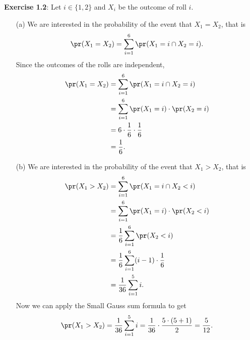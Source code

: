 \textbf{Exercise 1.2}: Let $i \in \{ 1,2 \}$ and $X_i$ be the outcome of roll $i$.

\begin{enumerate}
  \item[(a)] We are interested in the probability of the event that $X_1 = X_2$,
    that is
    \[
      \pr(X_1 = X_2) = \sum_{i=1}^6 \pr(X_1 = i \cap X_2 = i).
    \]
    Since the outcomes of the rolls are independent,
    \begin{align*}
      \pr(X_1 = X_2)  &= \sum_{i=1}^6 \pr(X_1 = i \cap X_2 = i) \\
                      &= \sum_{i=1}^6 \pr(X_1 = i) \cdot \pr(X_2 = i) \\
                      &= 6 \cdot \frac{1}{6} \cdot \frac{1}{6} \\
                      &= \frac{1}{6}.
    \end{align*}

  \item[(b)] We are interested in the probability of the event that $X_1 > X_2$,
    that is
    \begin{align*}
      \pr(X_1 > X_2)  &= \sum_{i=1}^6 \pr(X_1 = i \cap X_2 < i) \\
                      &= \sum_{i=1}^6 \pr(X_1 = i) \cdot \pr(X_2 < i) \\
                      &= \frac{1}{6} \sum_{i=1}^6 \pr(X_2 < i) \\
                      &= \frac{1}{6} \sum_{i=1}^6 (i-1) \cdot \frac{1}{6} \\
                      &= \frac{1}{36} \sum_{i=1}^5 i.
    \end{align*}
    Now we can apply the Small Gauss sum formula to get
    \[
      \pr(X_1 > X_2) = \frac{1}{36} \sum_{i=1}^5 i
        = \frac{1}{36} \cdot \frac{5 \cdot (5 + 1)}{2}
        = \frac{5}{12}.
    \]


\end{enumerate}
